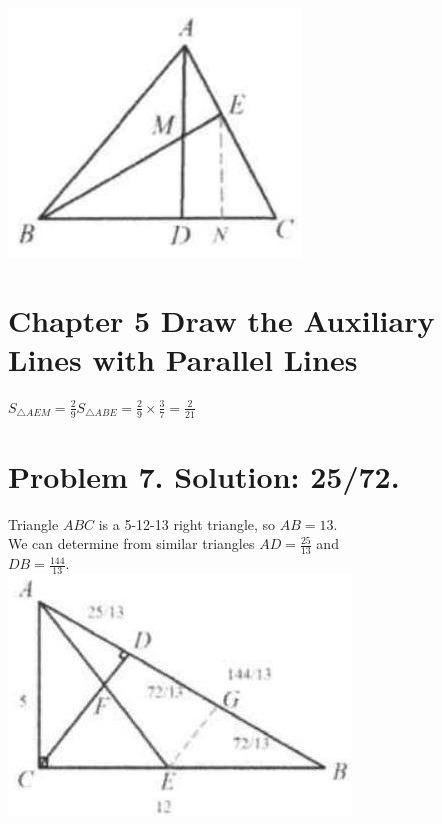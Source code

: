 \documentclass[10pt]{article}
\begin{document}
\includegraphics[max width=\textwidth, center]{2025_04_17_97bc1f7e44d93c271a88g-133(2)}

\section*{Chapter 5 Draw the Auxiliary Lines with Parallel Lines}
\(S_{\triangle A E M}=\frac{2}{9} S_{\triangle A B E}=\frac{2}{9} \times \frac{3}{7}=\frac{2}{21}\)

\section*{Problem 7. Solution: 25/72.}
Triangle \(A B C\) is a 5-12-13 right triangle, so \(A B=13\).\\
We can determine from similar triangles \(A D=\frac{25}{13}\) and\\
\(D B=\frac{144}{13}\).\\
\includegraphics[max width=\textwidth, center]{2025_04_17_97bc1f7e44d93c271a88g-134}
\end{document}
